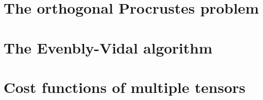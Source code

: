 \section{The orthogonal Procrustes problem}
\label{sec:orthogonal_procrustes_problem}


\section{The Evenbly-Vidal algorithm}
\label{sec:evenbly_vidal_algorithm}


\section{Cost functions of multiple tensors}
\label{sec:cost_functions_of_multiple_tensors}

